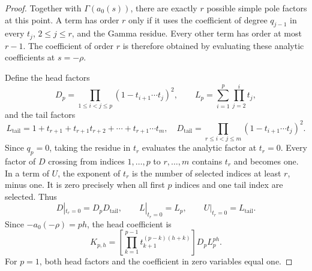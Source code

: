 \documentclass[11pt,a4paper]{article}
\numberwithin{equation}{section}
\theoremstyle{definition}
\begin{document}
\begin{proof}
Together with $\Gamma(a_0(s))$, there are exactly $r$ possible
simple pole factors at this point. A term has order $r$ only if it
uses the coefficient of degree $q_{j-1}$ in every $t_j$, $2\le j\le r$,
and the Gamma residue. Every other term has order at most $r-1$.
The coefficient of order $r$ is therefore obtained by evaluating
these analytic coefficients at $s=-\rho$.

Define the head factors
\[
D_p=\prod_{1\le i<j\le p}(1-t_{i+1}\cdots t_j)^2,
\qquad L_p=\sum_{i=1}^p\prod_{j=2}^i t_j,
\]
and the tail factors
\[
L_{\mathrm{tail}}=1+t_{r+1}+t_{r+1}t_{r+2}
                          +\cdots+t_{r+1}\cdots t_m,
\quad
D_{\mathrm{tail}}=\prod_{r\le i<j\le m}(1-t_{i+1}\cdots t_j)^2.
\]
Since $q_p=0$, taking the residue in $t_r$ evaluates the analytic
factor at $t_r=0$. Every factor of $D$ crossing from indices
$1,\ldots,p$ to $r,\ldots,m$ contains $t_r$ and becomes one.
In a term of $U$, the exponent of $t_r$ is the number of selected
indices at least $r$, minus one. It is zero precisely when all
first $p$ indices and one tail index are selected. Thus
\[
D|_{t_r=0}=D_pD_{\mathrm{tail}},\qquad
L|_{t_r=0}=L_p,\qquad U|_{t_r=0}=L_{\mathrm{tail}}.
\]
Since $-a_0(-\rho)=ph$, the head coefficient is
\begin{equation}\label{eq:headcoefficient}
K_{p,h}=\left[\prod_{k=1}^{p-1}t_{k+1}^{(p-k)(h+k)}\right]
 D_pL_p^{ph}.
\end{equation}
For $p=1$, both head factors and the coefficient in zero variables
equal one.


\end{proof}
\end{document}
